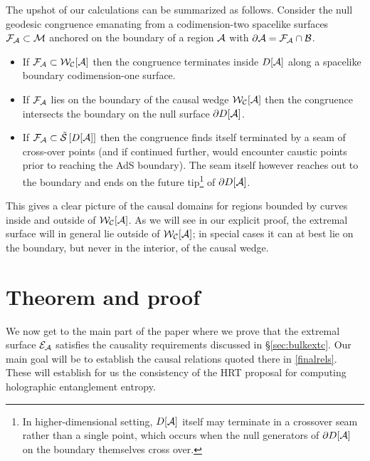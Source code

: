 \documentclass[12pt]{article}
\def\bulksplsep{{\tilde {\cal S}}}
\def\bulk{{\cal M}}
\def\bdy{{\cal B}}
\def\regA{{\cal A}}
\def\domdA{D[\regA]}
\def\extr{{\cal E}_\regA}
\def\CWA{{\cal W}_{\cal C}[\regA]}
\begin{document}
The upshot of our calculations can be summarized as follows. Consider the null geodesic congruence emanating from a codimension-two spacelike surfaces ${\cal F}_\regA \subset \bulk$  anchored on the boundary  of a region $\regA$ with $\partial \regA = {\cal F}_\regA \cap \bdy$.
\begin{itemize}
\item If ${\cal F}_\regA \subset \CWA$ then the congruence terminates inside 
$\domdA$ along a spacelike boundary codimension-one surface. 
\item If ${\cal F}_\regA$ lies on the boundary of the causal wedge $\CWA$ then the congruence intersects the boundary on the null surface $\partial \domdA$.
\item If ${\cal F}_\regA \subset \bulksplsep\left[\domdA\right]$ then the congruence finds itself terminated by a seam of cross-over points (and if continued further, would encounter caustic points prior to reaching the AdS boundary). The seam itself however reaches out to the boundary and ends on the future tip\footnote{ 
In higher-dimensional setting, $\domdA$ itself may terminate in a crossover seam rather than a single point, which occurs when the null generators of $\partial \domdA$ on the boundary themselves cross over.
} of $\partial \domdA$.
\end{itemize}
This gives a clear picture of the causal domains for regions bounded by curves inside and outside of $\CWA$.  As we will see in our explicit proof, the extremal surface will in general lie outside of $\CWA$; in special cases it can at best lie on the boundary, but never in the interior, of the causal wedge.

\section{Theorem and proof}
\label{sec:results}

We now get to the main part of the paper where we prove that the extremal surface $\extr$
satisfies the causality requirements discussed in \S\ref{sec:bulkextc}. Our main goal will be to establish the causal relations quoted there in \eqref{finalrels}.  
These will establish for us the consistency of the HRT proposal for computing holographic entanglement entropy. 
\end{document}
